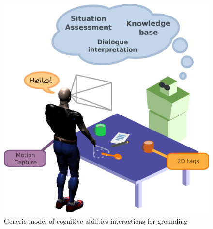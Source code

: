 \documentclass{svmult}
\begin{document}
\begin{figure}[!t]
\centering
  \includegraphics[width=0.8\linewidth]{figs/grounding_robot.png}
  \caption{Generic model of cognitive abilities interactions for grounding}
  \label{fig|overall-process}
\end{figure}

\end{document}
